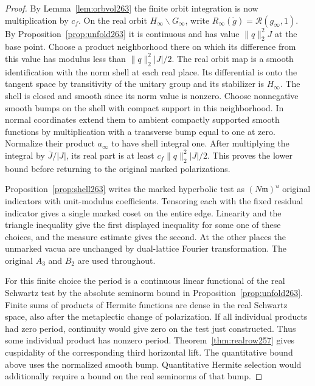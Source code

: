 \documentclass[a4paper,11pt]{article}
\theoremstyle{definition}
\theoremstyle{remark}
\numberwithin{equation}{section}
\begin{document}
\begin{proof}
By Lemma~\ref{lem:orbvol263} the finite orbit integration is
now multiplication by \(c_f\). On the real orbit
\(H_\infty\backslash G_\infty\), write
\(R_\infty(\dot g)=\mathcal R(g_\infty,1)\). By
Proposition~\ref{prop:unfold263} it is continuous and has
value \(\|q\|_2^2J\) at the base point. Choose a product
neighborhood there on which its difference from this value
has modulus less than \(\|q\|_2^2|J|/2\).
The real orbit map is a smooth identification with the norm
shell at each real place. Its differential is onto the tangent
space by transitivity of the unitary group and its stabilizer
is \(H_\infty\). The shell is closed and smooth since its norm
value is nonzero. Choose nonnegative smooth bumps on the shell
with compact support in this neighborhood. In normal coordinates
extend them to ambient compactly supported smooth functions by
multiplication with a transverse bump equal to one at zero.
Normalize their product \(a_\infty\) to have shell integral one.
After multiplying the integral by \(\bar J/|J|\), its real part
is at least \(c_f\|q\|_2^2|J|/2\). This proves the lower bound
before returning to the original marked polarizations.

Proposition~\ref{prop:shell263} writes the marked hyperbolic test
as \((N\mathfrak m)^u\) original indicators with unit-modulus
coefficients. Tensoring each with the fixed residual indicator
gives a single marked coset on the entire edge. Linearity and
the triangle inequality give the first displayed inequality
for some one of these choices, and the measure estimate gives
the second. At the other places the unmarked vacua are unchanged
by dual-lattice Fourier transformation. The original \(A_3\)
and \(B_2\) are used throughout.

For this finite choice the period is a continuous linear
functional of the real Schwartz test by the absolute seminorm
bound in Proposition~\ref{prop:unfold263}. Finite sums of products
of Hermite functions are dense in the real Schwartz space,
also after the metaplectic change of polarization. If all
individual products had zero period, continuity would give
zero on the test just constructed. Thus some individual
product has nonzero period. Theorem~\ref{thm:realrow257}
gives cuspidality of the corresponding third horizontal lift.
The quantitative bound above uses the normalized smooth bump.
Quantitative Hermite selection would additionally require a
bound on the real seminorms of that bump.
\end{proof}
\end{document}
